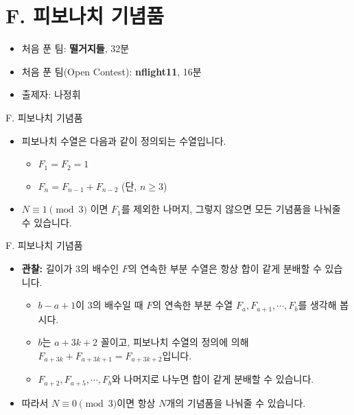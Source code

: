 \def\probno{F}
\def\probtitle{피보나치 기념품}

\section{\probno{}. \probtitle{}}

\begin{frame} %
    \sectiontitle{\probno{}}{\probtitle{}}
    \begin{itemize}
        \item 처음 푼 팀: \textbf{떨거지들}, 32분
        \item 처음 푼 팀(Open Contest): \textbf{nflight11}, 16분
        \item 출제자: 나정휘
    \end{itemize}
\end{frame}

\begin{frame}{\probno{}. \probtitle{}}
    \begin{itemize}
        \item 피보나치 수열은 다음과 같이 정의되는 수열입니다.
        \begin{itemize}
            \item $F_1 = F_2 = 1$
            \item $F_n = F_{n-1} + F_{n-2}$ (단, $n \ge 3$)
        \end{itemize}
        \item $N \equiv 1 \pmod 3$ 이면 $F_1$를 제외한 나머지, 그렇지 않으면 모든 기념품을 나눠줄 수 있습니다.
    \end{itemize}
\end{frame}

\begin{frame}{\probno{}. \probtitle{}}
    \begin{itemize}
        \item \textbf{관찰:} 길이가 3의 배수인 $F$의 연속한 부분 수열은 항상 합이 같게 분배할 수 있습니다.
        \begin{itemize}
            \item $b-a+1$이 3의 배수일 때 $F$의 연속한 부분 수열 $F_a, F_{a+1}, \cdots, F_b$를 생각해 봅시다.
            \item $b$는 $a+3k+2$ 꼴이고, 피보나치 수열의 정의에 의해 $F_{a+3k} + F_{a+3k+1} = F_{a+3k+2}$입니다.
            \item $F_{a+2}, F_{a+5}, \cdots, F_{b}$와 나머지로 나누면 합이 같게 분배할 수 있습니다.
        \end{itemize}
        \item 따라서 $N \equiv 0 \pmod 3$이면 항상 $N$개의 기념품을 나눠줄 수 있습니다.
    \end{itemize}
\end{frame}

